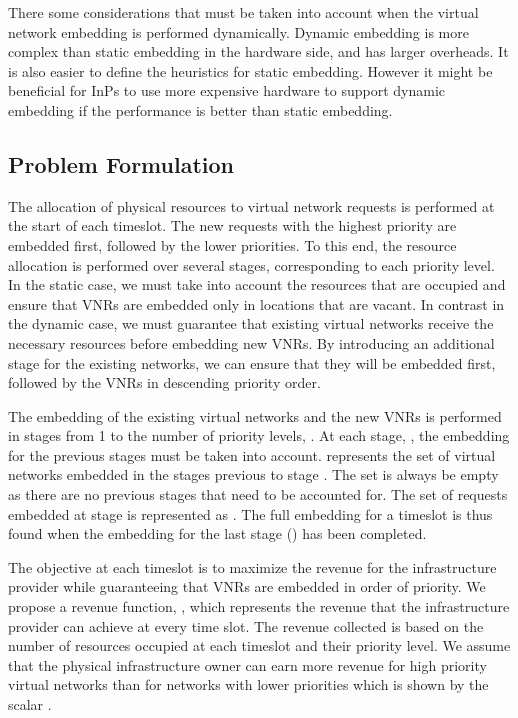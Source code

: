 \documentclass[conference]{IEEEtran}
\begin{document}
There some considerations that must be taken into account when the virtual network embedding is performed dynamically. Dynamic embedding is more complex than static embedding in the hardware side, and has larger overheads. It is also easier to define the heuristics for static embedding. However it might be beneficial for InPs to use more expensive hardware to support dynamic embedding if the performance is better than static embedding.













\subsection{Problem Formulation}
The allocation of physical resources to virtual network requests is performed at the start of each timeslot. The new requests with the highest priority are embedded first, followed by the lower priorities. To this end, the resource allocation is performed over several stages, corresponding to each priority level.
In the static case, we must take into account the resources that are occupied and ensure that VNRs are embedded only in locations that are vacant. In contrast in the dynamic case, we must guarantee that existing virtual networks receive the necessary resources before embedding new VNRs. By introducing an additional stage for the existing networks, we can ensure that they will be embedded first, followed by the VNRs in descending priority order.

The embedding of the existing virtual networks and the new VNRs is performed in stages from 1 to the number of priority levels, . At each stage, , the embedding for the previous stages must be taken into account.  represents the set of virtual networks embedded in the stages previous to stage . The set  is always be empty as there are no previous stages that need to be accounted for. The set of requests embedded at stage  is represented as . The full embedding for a timeslot is thus found when the embedding for the last stage () has been completed.

The objective at each timeslot  is to maximize the revenue for the infrastructure provider while guaranteeing that VNRs are embedded in order of priority. We propose a revenue function, , which represents the revenue that the infrastructure provider can achieve at every time slot. The revenue collected is based on the number of resources occupied at each timeslot and their priority level. We assume that the physical infrastructure owner can earn more revenue for high priority virtual networks than for networks with lower priorities which is shown by the scalar  .
\end{document}
